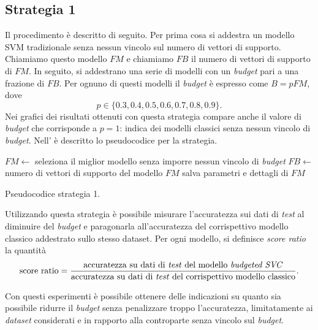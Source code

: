 \subsection{Strategia 1}
Il procedimento è descritto di seguito. Per prima cosa si addestra un modello SVM tradizionale senza nessun vincolo sul numero di vettori di supporto. Chiamiamo questo modello $FM$ e chiamiamo $FB$ il numero di vettori di supporto di $FM$.
In seguito, si addestrano una serie di modelli con un \emph{budget} pari a una frazione di $FB$.
Per ognuno di questi modelli il \emph{budget} è espresso come $B=pFM$, dove
\begin{equation*}
    p\in\{0.3, 0.4, 0.5, 0.6, 0.7, 0.8, 0.9\}.
\end{equation*}
Nei grafici dei risultati ottenuti con questa strategia compare anche il valore di \emph{budget} che corrisponde a $p=1$: indica dei modelli classici senza nessun vincolo di \emph{budget}.
Nell' è descritto lo pseudocodice per la strategia.
\begin{algorithm}
    \SetAlgoLined
    $FM \gets$ seleziona il miglior modello senza imporre nessun vincolo di \emph{budget}\;
    $FB \gets$ numero di vettori di supporto del modello $FM$\;
    salva parametri e dettagli di $FM$\;
\caption{Pseudocodice strategia 1.}
\label{alg:esperimenti_1}
\end{algorithm}

Utilizzando questa strategia è possibile misurare l'accuratezza sui dati di \emph{test} al diminuire del \emph{budget} e paragonarla all'accuratezza del corrispettivo modello classico addestrato sullo stesso dataset.
Per ogni modello, si definisce \emph{score ratio} la quantità
\begin{equation*}
    \text{score ratio} = \frac{\text{accuratezza su dati di \emph{test} del modello \emph{budgeted SVC}}}{\text{accuratezza su dati di \emph{test} del corrispettivo modello classico}}.
\end{equation*}

Con questi esperimenti è possibile ottenere delle indicazioni su quanto sia possibile ridurre il \emph{budget} senza penalizzare troppo l'accuratezza, limitatamente ai \emph{dataset} considerati e in rapporto alla controparte senza vincolo sul \emph{budget}.

